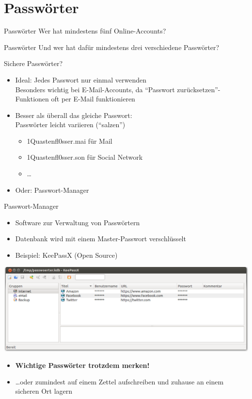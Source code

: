 \section{Passwörter}
  \begin{frame}{Passwörter}
    \Large Wer hat mindestens fünf Online-Accounts? 
  \end{frame}
  \begin{frame}{Passwörter}
    \Large Und wer hat dafür mindestens drei verschiedene Passwörter?
  \end{frame}
  \begin{frame}{Sichere Passwörter?}
    \begin{itemize}
      \item Ideal: Jedes Passwort nur einmal verwenden\\
      \small Besonders wichtig bei E-Mail-Accounts, da ``Passwort zurücksetzen''-Funktionen oft per E-Mail funktionieren \normalsize
      \item Besser als überall das gleiche Passwort:\\Passwörter leicht variieren (``salzen'')
      \begin{itemize}
        \item 1Quastenfl0sser.mai für Mail
        \item 1Quastenfl0sser.son für Social Network
        \item \ldots
      \end{itemize}
      \item Oder: Passwort-Manager
    \end{itemize}
  \end{frame}
  \begin{frame}{Passwort-Manager}
    \begin{itemize}
      \item Software zur Verwaltung von Passwörtern
      \item Datenbank wird mit einem Master-Passwort verschlüsselt
      \item Beispiel: KeePassX (Open Source)
    \end{itemize}
      \includegraphics[width=\textwidth]{images/keepassx.png}
    \begin{itemize}
      \item \textbf{Wichtige Passwörter trotzdem merken!}
      \item \ldots oder zumindest auf einem Zettel aufschreiben und zuhause an einem sicheren Ort lagern
    \end{itemize}
  \end{frame}
